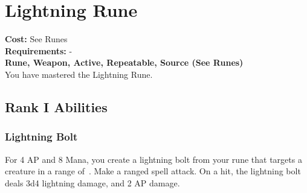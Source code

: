 \section{Lightning Rune}\label{rune:lightning}
\textbf{Cost:} See Runes\\
\textbf{Requirements:} -\\
\textbf{Rune, Weapon, Active, Repeatable, Source (See Runes)}\\
You have mastered the Lightning Rune.

\subsection{Rank I Abilities}

\subsubsection{Lightning Bolt}
For 4 AP and 8 Mana, you create a lightning bolt from your rune that targets a creature in a range of~.
Make a ranged spell attack.
On a hit, the lightning bolt deals 3d4 lightning damage, and 2 AP damage.